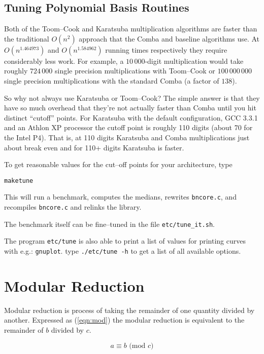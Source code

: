\documentclass[synpaper]{book}
\begin{document}
\section{Tuning Polynomial Basis Routines}

Both of the Toom--Cook and Karatsuba multiplication algorithms are faster than the traditional
$O(n^2)$ approach that the Comba and baseline algorithms use.  At $O(n^{1.464973})$ and
$O(n^{1.584962})$ running times respectively they require considerably less work.  For example, a
$10\,000$-digit multiplication would take roughly $724\,000$ single precision multiplications with
Toom--Cook or $100\,000\,000$ single precision multiplications with the standard Comba (a factor of
$138$).

So why not always use Karatsuba or Toom--Cook?  The simple answer is that they have so much
overhead that they're not actually faster than Comba until you hit distinct  ``cutoff'' points.
For Karatsuba with the default configuration, GCC 3.3.1 and an Athlon XP processor the cutoff point
is roughly 110 digits (about 70 for the Intel P4).  That is, at 110 digits Karatsuba and Comba
multiplications just about break even and for 110+ digits Karatsuba is faster.

To get reasonable values for the cut--off points for your architecture, type

\begin{alltt}
make tune
\end{alltt}

This will run a benchmark, computes the medians, rewrites \texttt{bncore.c}, and recompiles
\texttt{bncore.c} and relinks the library.

The benchmark itself can be fine--tuned in the file \texttt{etc/tune\_it.sh}.

The program \texttt{etc/tune} is also able to print a list of values for printing curves with e.g.:
\texttt{gnuplot}. type \texttt{./etc/tune -h} to get a list of all available options.

\chapter{Modular Reduction}

Modular reduction is process of taking the remainder of one quantity divided by another.  Expressed
as (\ref{eqn:mod}) the modular reduction is equivalent to the remainder of $b$ divided by $c$.

\begin{equation}
  a \equiv b \mbox{ (mod }c\mbox{)}
  \label{eqn:mod}
\end{equation}
\end{document}
